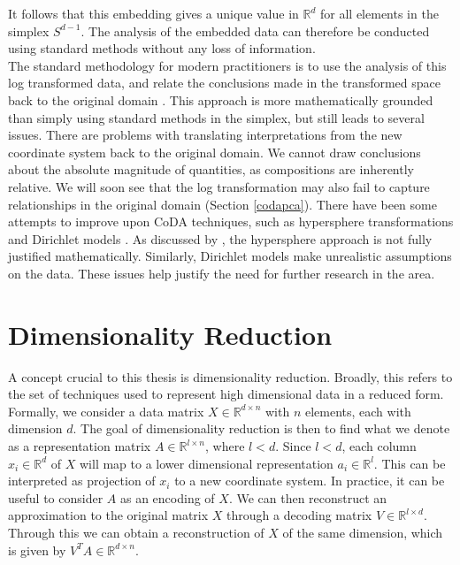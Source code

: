 It follows that this embedding gives a unique value in $\mathbb{R}^d$ for all elements in the simplex $S^{d-1}$. The analysis of the embedded data can therefore be conducted using standard methods without any loss of information. \\

The standard methodology for modern practitioners is to use the analysis of this log transformed data, and relate the conclusions made in the transformed space back to the original domain \citep{Aitchison2003}. This approach is more mathematically grounded than simply using standard methods in the simplex, but still leads to several issues. There are problems with translating interpretations from the new coordinate system back to the original domain. We cannot draw conclusions about the absolute magnitude of quantities, as compositions are inherently relative. We will soon see that the log transformation may also fail to capture relationships in the original domain (Section \ref{codapca}). There have been some attempts to improve upon CoDA techniques, such as hypersphere transformations \citep{} and Dirichlet models \citep{}. As discussed by \cite{}, the hypersphere approach is not fully justified mathematically. Similarly, Dirichlet models make unrealistic assumptions on the data. These issues help justify the need for further research in the area. 

\section{Dimensionality Reduction}
\label{sec:dimred}

A concept crucial to this thesis is dimensionality reduction. Broadly, this refers to the set of techniques used to represent high dimensional data in a reduced form. Formally, we consider a data matrix $X \in \mathbb{R}^{d \times n}$ with $n$ elements, each with dimension $d$. The goal of dimensionality reduction is then to find what we denote as a representation matrix $A \in \mathbb{R}^{l \times n}$, where $l < d$. Since $l < d$, each column $x_i \in \mathbb{R}^d$ of $X$ will map to a lower dimensional representation $a_i \in \mathbb{R}^l$. This can be interpreted as projection of $x_i$ to a new coordinate system. In practice, it can be useful to consider $A$ as an encoding of $X$. We can then reconstruct an approximation to the original matrix $X$ through a decoding matrix $V \in \mathbb{R}^{l \times d}$. Through this we can obtain a reconstruction of $X$ of the same dimension, which is given by $V^TA \in \mathbb{R}^{d \times n}$. \\

